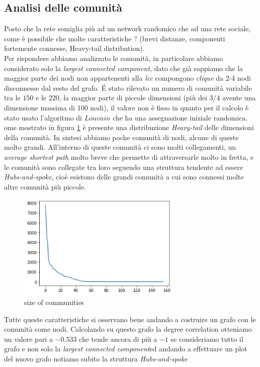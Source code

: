 \documentclass[a4paper]{article}
\newcommand{\lcc}{\textit{largest connected component}}
\begin{document}
\subsection{Analisi delle comunità}
Posto che la rete somiglia più ad un network randomico che ad una rete sociale, come è possibile che molte caratteristiche ? (brevi distanze, componenti fortemente connesse, Heavy-tail distribution).\\
Per rispondere abbiamo analizzato le comunità, in particolare abbiamo considerato solo la \lcc, dato che già sappiamo che la maggior parte dei nodi non appartenenti alla \textit{lcc} compongono \textit{clique} da 2-4 nodi disconnesse dal resto del grafo.
É stato rilevato un numero di comunità variabile tra le $150 \text{ e le } 220$, la maggior parte di piccole dimensioni (più dei 3/4 avente una dimensione massima di 100 nodi), il valore non è fisso in quanto per il calcolo è stato usato l'algoritmo di $Louvain$ che ha una assegnazione iniziale randomica.
ome mostrato in figura \ref{FIG:communities_sizes} è presente una distribuzione \textit{Heavy-tail} delle dimensioni della comunità.
In sintesi abbiamo poche comunità di nodi, alcune di queste molto grandi.
All'interno di queste comunità ci sono molti collegamenti, un \textit{average shortest path} molto breve che permette di attraversarle molto in fretta, e le comunità sono collegate tra loro seguendo una struttura tendente ad essere \textit{Hubs-and-spoke}, cioè esistono delle grandi comunità a cui sono connessi molte altre comunità più piccole. \\
\begin{figure}[!ht]
\centering
\includegraphics[width=0.7\textwidth]{community_size.png}
\caption{size of communities} \label{FIG:communities_sizes}
\end{figure}
Tutte queste caratteristiche si osservano bene andando a costruire un grafo con le comunità come nodi.
Calcolando su questo grafo la degree correlation otteniamo un valore pari a $-0.533$ che tende ancora di più a $-1$ se consideriamo tutto il grafo e non solo la \lcc ed andando a effettuare un plot del nuovo grafo notiamo subito la struttura \textit{Hubs-and-spoke}
\end{document}

